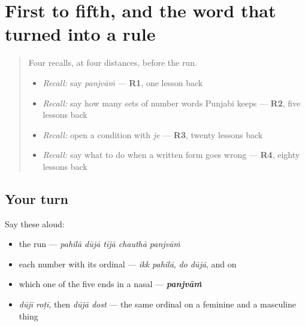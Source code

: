 \section[\texorpdfstring{\pa{ਪਹਿਲਾ} · \pa{ਦੂਜਾ} … (pahilā · dūjā …)}{ਪਹਿਲਾ · ਦੂਜਾ … (pahilā · dūjā …)}]{First to fifth, and the word that turned into a rule}

\label{lesson:PA-R44-first-to-fifth}



\begin{quote}
Four recalls, at four distances, before the run.

\begin{itemize}
\raggedright
  \item \emph{Recall:} say \emph{panjvāṁ} — \textbf{R1}, one lesson back
  \item \emph{Recall:} say how many sets of number words Punjabi keeps — \textbf{R2}, five lessons back
  \item \emph{Recall:} open a condition with \emph{je} — \textbf{R3}, twenty lessons back
  \item \emph{Recall:} say what to do when a written form goes wrong — \textbf{R4}, eighty lessons back
\end{itemize}
\end{quote}

\subsection*{Your turn}
Say these aloud:

\begin{itemize}
\raggedright
  \item the run — \emph{pahilā dūjā tījā chauthā panjvāṁ}
  \item each number with its ordinal — \emph{ikk pahilā}, \emph{do dūjā}, and on
  \item which one of the five ends in a nasal — \emph{\textbf{panjvāṁ}}
  \item \emph{dūjī roṭī}, then \emph{dūjā dost} — the same ordinal on a feminine and a masculine thing
\end{itemize}

